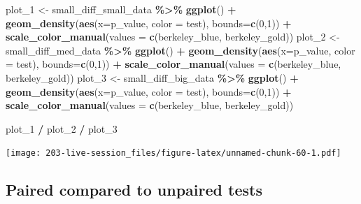 \documentclass[
]{book}
\newenvironment{Shaded}{\begin{snugshade}}{\end{snugshade}}
\newcommand{\AttributeTok}[1]{\textcolor[rgb]{0.13,0.29,0.53}{#1}}
\newcommand{\DecValTok}[1]{\textcolor[rgb]{0.00,0.00,0.81}{#1}}
\newcommand{\FunctionTok}[1]{\textcolor[rgb]{0.13,0.29,0.53}{\textbf{#1}}}
\newcommand{\NormalTok}[1]{#1}
\newcommand{\OtherTok}[1]{\textcolor[rgb]{0.56,0.35,0.01}{#1}}
\newcommand{\SpecialCharTok}[1]{\textcolor[rgb]{0.81,0.36,0.00}{\textbf{#1}}}
\theoremstyle{definition}
\theoremstyle{definition}
\theoremstyle{definition}
\theoremstyle{definition}
\theoremstyle{remark}
\begin{document}
\begin{Shaded}
\begin{Highlighting}[]
\NormalTok{plot\_1 }\OtherTok{\textless{}{-}}\NormalTok{ small\_diff\_small\_data }\SpecialCharTok{\%\textgreater{}\%}
  \FunctionTok{ggplot}\NormalTok{() }\SpecialCharTok{+}
  \FunctionTok{geom\_density}\NormalTok{(}\FunctionTok{aes}\NormalTok{(}\AttributeTok{x=}\NormalTok{p\_value, }\AttributeTok{color =}\NormalTok{ test), }\AttributeTok{bounds=}\FunctionTok{c}\NormalTok{(}\DecValTok{0}\NormalTok{,}\DecValTok{1}\NormalTok{)) }\SpecialCharTok{+}
  \FunctionTok{scale\_color\_manual}\NormalTok{(}\AttributeTok{values =} \FunctionTok{c}\NormalTok{(berkeley\_blue, berkeley\_gold))}
\NormalTok{plot\_2 }\OtherTok{\textless{}{-}}\NormalTok{ small\_diff\_med\_data }\SpecialCharTok{\%\textgreater{}\%}
  \FunctionTok{ggplot}\NormalTok{() }\SpecialCharTok{+}
  \FunctionTok{geom\_density}\NormalTok{(}\FunctionTok{aes}\NormalTok{(}\AttributeTok{x=}\NormalTok{p\_value, }\AttributeTok{color =}\NormalTok{ test), }\AttributeTok{bounds=}\FunctionTok{c}\NormalTok{(}\DecValTok{0}\NormalTok{,}\DecValTok{1}\NormalTok{)) }\SpecialCharTok{+}
  \FunctionTok{scale\_color\_manual}\NormalTok{(}\AttributeTok{values =} \FunctionTok{c}\NormalTok{(berkeley\_blue, berkeley\_gold))}
\NormalTok{plot\_3 }\OtherTok{\textless{}{-}}\NormalTok{ small\_diff\_big\_data }\SpecialCharTok{\%\textgreater{}\%}
  \FunctionTok{ggplot}\NormalTok{() }\SpecialCharTok{+}
  \FunctionTok{geom\_density}\NormalTok{(}\FunctionTok{aes}\NormalTok{(}\AttributeTok{x=}\NormalTok{p\_value, }\AttributeTok{color =}\NormalTok{ test), }\AttributeTok{bounds=}\FunctionTok{c}\NormalTok{(}\DecValTok{0}\NormalTok{,}\DecValTok{1}\NormalTok{)) }\SpecialCharTok{+}
  \FunctionTok{scale\_color\_manual}\NormalTok{(}\AttributeTok{values =} \FunctionTok{c}\NormalTok{(berkeley\_blue, berkeley\_gold))}

\NormalTok{plot\_1 }\SpecialCharTok{/}\NormalTok{ plot\_2 }\SpecialCharTok{/}\NormalTok{ plot\_3}
\end{Highlighting}
\end{Shaded}

\texttt{[image: 203-live-session\_files/figure-latex/unnamed-chunk-60-1.pdf]}

\hypertarget{paired-compared-to-unpaired-tests}{%
\subsection{Paired compared to unpaired tests}\label{paired-compared-to-unpaired-tests}}
\end{document}
